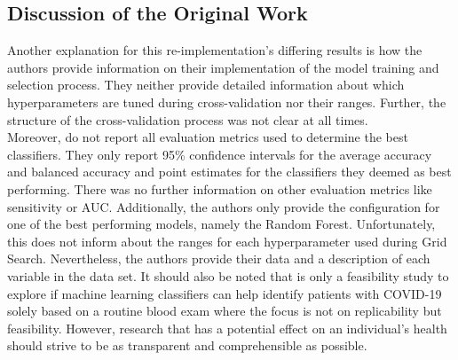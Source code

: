 \subsection{Discussion of the Original Work}
Another explanation for this re-implementation's differing results is how 
the authors provide information on their implementation of the model 
training and selection process. They neither provide detailed 
information about which hyperparameters are tuned during cross-validation nor 
their ranges. Further, the structure of the cross-validation process was not 
clear at all times.
\\
Moreover, \citeauthor{RN127} do not report all evaluation metrics used to 
determine the best classifiers. They only report 95\% confidence intervals for 
the average accuracy and balanced accuracy and point estimates for the 
classifiers they deemed as best performing. There was no further information 
on other evaluation metrics like sensitivity or AUC. Additionally, the authors 
only provide the configuration for one of the best performing models, 
namely the Random Forest. Unfortunately, this does not inform about the ranges 
for each hyperparameter used during Grid Search.
Nevertheless, the authors provide their data and a description of each 
variable in the data set. It should also be noted that \cite{RN127} is only a 
feasibility study to explore if machine learning classifiers can help identify 
patients with COVID-19 solely based on a routine blood exam where the focus is 
not on replicability but feasibility. However, research that has a 
potential effect on an individual's health should strive to be as transparent 
and comprehensible as possible.

